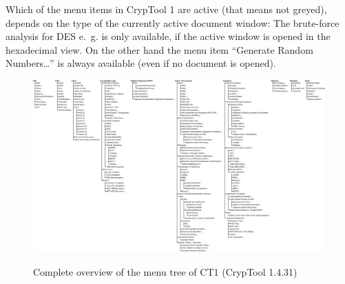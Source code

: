 Which of the menu items in CrypTool 1 are active (that means not greyed),
depends on the type of the currently active document window:
The brute-force analysis for DES e.~g. is only
available, if the active window is opened in the hexadecimal view. 
On the other hand the menu item ``Generate Random Numbers\dots''
is always available (even if no document is opened).



\clearpage
\begin{figure}[hb]
\begin{center}
\vspace{-30pt}
\includegraphics[scale=0.35, angle=270]
                {figures/CT1-menutree-en}
\hypertarget{menu-overview-CT1}{}
\caption{Complete overview of the menu tree of CT1 (CrypTool 1.4.31)} 
\label{menu-overview-CT1}
\end{center}
\end{figure}
\clearpage




